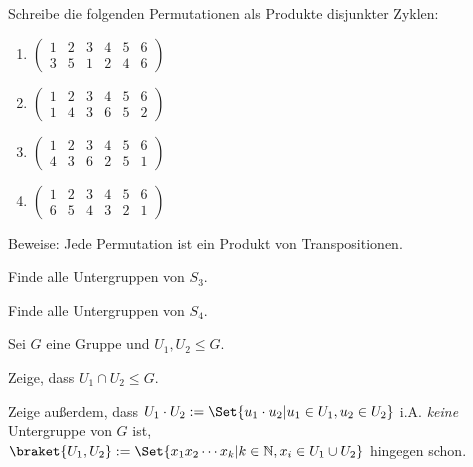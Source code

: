\begin{sheet}
\begin{problem}[title={Zyklenzerlegung}]
\begin{subproblem}[difficulty={leicht}]
Schreibe die folgenden Permutationen als Produkte disjunkter Zyklen:
\begin{enumerate}[label=(\roman*)]
\item $\begin{pmatrix} 1 & 2 & 3 & 4 & 5 & 6 \\ 3 & 5 & 1 & 2 & 4 & 6\end{pmatrix}$
\item $\begin{pmatrix} 1 & 2 & 3 & 4 & 5 & 6 \\ 1 & 4 & 3 & 6 & 5 & 2\end{pmatrix}$
\item $\begin{pmatrix} 1 & 2 & 3 & 4 & 5 & 6 \\ 4 & 3 & 6 & 2 & 5 & 1\end{pmatrix}$
\item $\begin{pmatrix} 1 & 2 & 3 & 4 & 5 & 6 \\ 6 & 5 & 4 & 3 & 2 & 1\end{pmatrix}$
\end{enumerate}
\end{subproblem}

\begin{subproblem}[difficulty={mittel}]
Beweise: Jede Permutation ist ein Produkt von Transpositionen.
\end{subproblem}
\end{problem}

\begin{problem}
\begin{subproblem}[difficulty={leicht}]
Finde alle Untergruppen von $S_3$.
\end{subproblem}
\begin{subproblem}[difficulty={leicht, aber aufwändig}]
Finde alle Untergruppen von $S_4$.
\end{subproblem}
\end{problem}




\begin{problem}[title={Neue Untergruppen aus alten}]
Sei $G$ eine Gruppe und $U_1,U_2\leq G$.
\begin{subproblem}[difficulty={sehr leicht}]
Zeige, dass $U_1\cap U_2\leq G$.
\end{subproblem}
\begin{subproblem}[difficulty={leicht}]
Zeige außerdem, dass $U_1\cdot U_2 := \Set{u_1\cdot u_2 | u_1\in U_1, u_2\in U_2}$ i.A. \emph{keine} Untergruppe von $G$ ist, $\braket{U_1,U_2} := \Set{x_1 x_2 \cdots x_k | k\in\IN, x_i\in U_1\cup U_2}$ hingegen schon.
\end{subproblem}
\end{problem}


\end{sheet}
